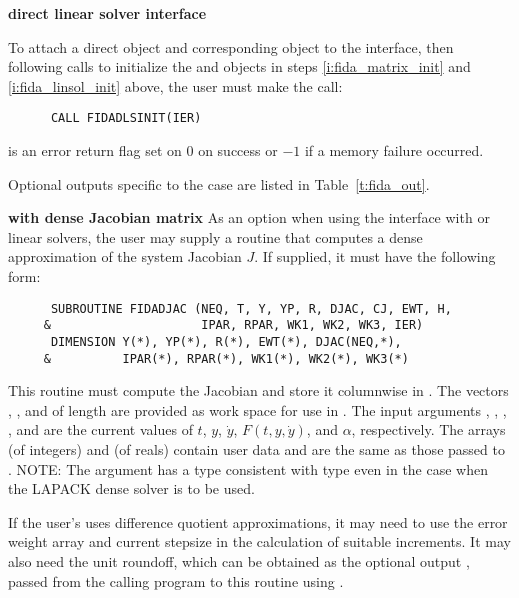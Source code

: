 \begin{Steps}

  {\bf {\idadls} direct linear solver interface}

  To attach a direct {\sunlinsol} object and corresponding
  {\sunmatrix} object to the {\idadls} interface, then following calls
  to initialize the {\sunlinsol} and {\sunmatrix} objects in steps
  \ref{i:fida_matrix_init} and \ref{i:fida_linsol_init} above, the user
  must make the call:
\begin{verbatim}
      CALL FIDADLSINIT(IER)
\end{verbatim}
   is an error return flag set on $0$ on success or $-1$ if a memory
  failure occurred.

  Optional outputs specific to the {\idadls} case are listed in
  Table~\ref{t:fida_out}.

  {\bf {\idadls} with dense Jacobian matrix}
  As an option when using the {\idadls} interface with
  {\sunlinsoldense} or {\sunlinsollapdense} linear solvers, the user
  may supply a routine that computes a dense approximation of the
  system Jacobian  $J$. If supplied, it must
  have the following form:
\begin{verbatim}
      SUBROUTINE FIDADJAC (NEQ, T, Y, YP, R, DJAC, CJ, EWT, H,
     &                     IPAR, RPAR, WK1, WK2, WK3, IER)
      DIMENSION Y(*), YP(*), R(*), EWT(*), DJAC(NEQ,*),
     &          IPAR(*), RPAR(*), WK1(*), WK2(*), WK3(*)
\end{verbatim}
  This routine must compute the Jacobian and store it columnwise in .
  The vectors , , and  of length  are provided
  as work space for use in .
  The input arguments , , , , and  are the
  current values of $t$, $y$, $\dot{y}$, $F(t,y,\dot{y})$, and $\alpha$, respectively.
  The arrays  (of integers) and  (of reals) contain user data
  and are the same as those passed to .
  NOTE: The argument  has a type consistent with {\CC} type 
  even in the case when the LAPACK dense solver is to be used.

  If the user's  uses difference quotient approximations, it
  may need to use the error weight array  and current stepsize 
  in the calculation of suitable increments.  It may also need the unit
  roundoff, which can be obtained as the optional output ,
  passed from the calling program to this routine using .


\end{Steps}
